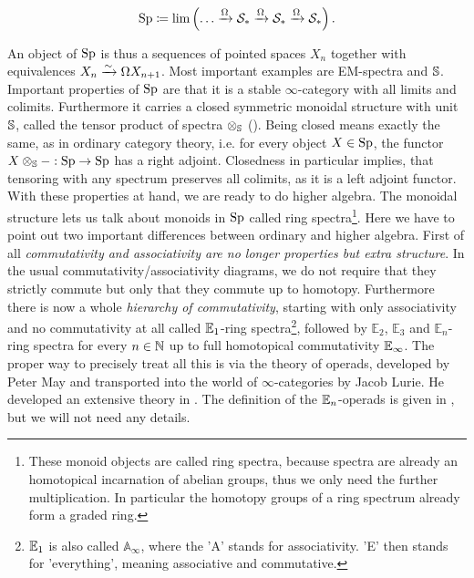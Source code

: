\begin{equation*}
    \Sp\coloneqq \lim\left( \dots\xrightarrow{\Omega}\Spc_* \xrightarrow{\Omega} \Spc_* \xrightarrow{\Omega}\Spc_* \right).
\end{equation*}

An object of $\Sp$ is thus a sequences of pointed spaces $X_n$ together with equivalences $X_n\rai \Omega X_{n+1}$. %
Most important examples are EM-spectra and $\S$.\\
Important properties of $\Sp$ are that it is a stable $\infty$-category with all limits and colimits. Furthermore it carries a closed symmetric monoidal structure with unit $\S$, called the tensor product of spectra $\otimes_\S$ (\cite[Corollary~4.8.2.19]{lurie2017higher}). Being closed means exactly the same, as in ordinary category theory, i.e. for every object $X\in \Sp$, the functor $X\otimes_\S-:\Sp\to \Sp $ has a right adjoint. 
Closedness in particular implies, that tensoring with any spectrum preserves all colimits, as it is a left adjoint functor. \\
With these properties at hand, we are ready to do higher algebra.
The monoidal structure lets us talk about monoids in $\Sp$ called ring spectra\footnote{These monoid objects are called ring spectra, because spectra are already an homotopical incarnation of abelian groups, thus we only need the further multiplication. In particular the homotopy groups of a ring spectrum already form a graded ring.}. Here we have to point out two important differences between ordinary and higher algebra. 
First of all \textit{commutativity and associativity are no longer  properties but extra structure}. In the usual commutativity/associativity diagrams, we do not require that they strictly commute but only that they commute up to homotopy. 
Furthermore there is now a whole \textit{hierarchy of commutativity}, starting with only associativity and no commutativity at all called $\Eone$-ring spectra\footnote{$\Eone$ is also called $\mathbb{A}_\infty$, where the 'A' stands for associativity. 'E' then stands for 'everything', meaning associative and commutative.}, followed by $\mathbb{E}_2$, $\mathbb{E}_3$ and $\mathbb{E}_n$-ring spectra for every $n\in \N$ up to full homotopical commutativity $\Einf$. 
The proper way to precisely treat all this is via the theory of operads, developed by Peter May and transported into the world of $\infty$-categories by Jacob Lurie. 
He developed an extensive theory in \cite[Chapter~2,3,4]{lurie2017higher}. The definition of the $\En$-operads is given in \cite[Definition~5.1.0.2]{lurie2017higher}, but we will not need any details. \\
